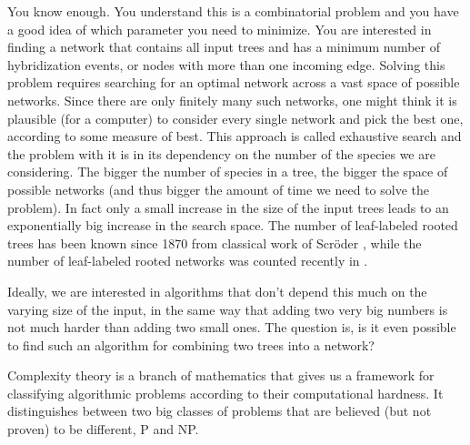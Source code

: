 You know enough. You understand this is a combinatorial problem and you have a good idea of which parameter you need to minimize. You are interested in finding a network that contains all input trees and has a minimum number of hybridization events, or nodes with more than one incoming edge. 
Solving this problem requires searching for an optimal network across a vast space of possible networks. Since there are only finitely many such networks, one might think it is plausible (for a computer) to consider every single network and pick the best one, according to some measure of best. This approach is called exhaustive search and the problem with it is in its dependency on the number of the species we are considering. The bigger the number of species in a tree, the bigger the space of possible networks (and thus bigger the amount of time we need to solve the problem). 
In fact only a small increase in the size of the input trees leads to an exponentially big increase in the search space. The number of leaf-labeled rooted trees has been known since 1870 from classical work of Scr\"{o}der \cite{countingtrees}, while the number of leaf-labeled rooted networks was counted recently in \cite{countingdags}.


Ideally, we are interested in algorithms that don't depend this much on the varying size of the input, in the same way that adding two very big numbers is not much harder than adding two small ones. The question is, is it even possible to find such an algorithm for combining two trees into a network? 

Complexity theory is a branch of mathematics that gives us a framework for classifying algorithmic problems according to their computational hardness. It distinguishes between two big classes of problems that are believed (but not proven) to be different, P and NP. 




